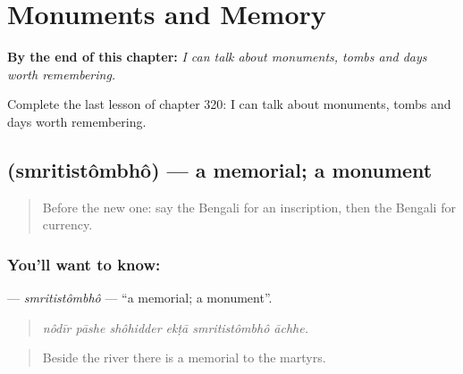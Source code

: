 
\chapter{Monuments and Memory}
\label{ch:bn-monuments-and-memory}

\begin{chapteropening}
\textbf{By the end of this chapter:} \emph{I can talk about monuments, tombs and days worth remembering.}

Complete the last lesson of chapter 320: I can talk about monuments, tombs and days worth remembering.
\end{chapteropening}

\section[\texorpdfstring{\bn{স্মৃতিস্তম্ভ} (smritistômbhô)}{স্মৃতিস্তম্ভ (smritistômbhô)}]{ (smritistômbhô) — a memorial; a monument}

\label{lesson:BN-C320-smritistombho}



\begin{quote}
Before the new one: say the Bengali for an inscription, then the Bengali for currency.
\end{quote}

\subsection*{You'll want to know: }
\textbf{} — \emph{smritistômbhô} — \textquotedblleft{}a memorial; a monument\textquotedblright{}.

\begin{quote}
     
\end{quote}

\begin{quote}
\emph{nôdīr pāshe shôhidder ekṭā smritistômbhô āchhe.}
\end{quote}

\begin{quote}
Beside the river there is a memorial to the martyrs.
\end{quote}

